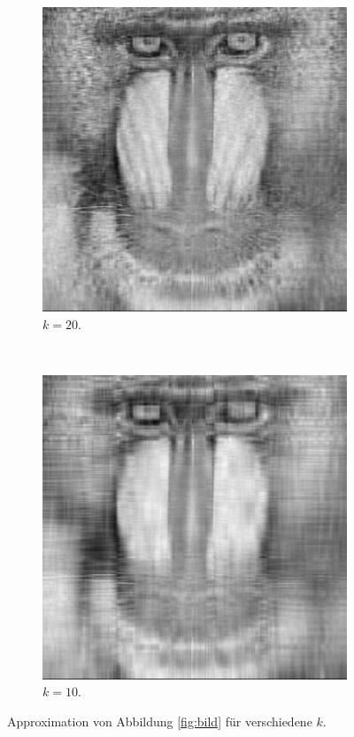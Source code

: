 \documentclass{scrartcl}
\begin{document}
\begin{figure}
            \begin{subfigure}[b]{0.3\textwidth}
                \includegraphics[width=\textwidth]{A1/build/A20.pdf}
                \caption{$k=20$.}
                \label{fig:A20}
            \end{subfigure}
            ~
            \begin{subfigure}[b]{0.3\textwidth}
                \includegraphics[width=\textwidth]{A1/build/A10.pdf}
                \caption{$k=10$.}
                \label{fig:A10}
            \end{subfigure}
            \caption{Approximation von Abbildung \ref{fig:bild} für verschiedene $k$.}\label{fig:approx}
        \end{figure}
\end{document}

